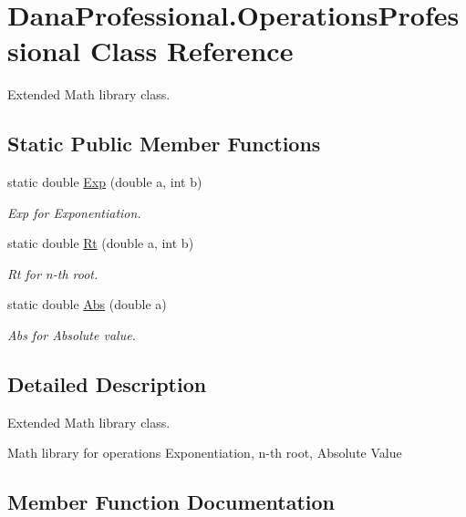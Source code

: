 \hypertarget{classDanaProfessional_1_1OperationsProfessional}{}\section{Dana\+Professional.\+Operations\+Professional Class Reference}
\label{classDanaProfessional_1_1OperationsProfessional}


Extended Math library class.  


\subsection*{Static Public Member Functions}
\begin{DoxyCompactItemize}
\item 
static double \hyperlink{classDanaProfessional_1_1OperationsProfessional_a42a851ecd5d926bbf74edad1f8059866}{Exp} (double a, int b)
\begin{DoxyCompactList}\small\item\em Exp for Exponentiation. \end{DoxyCompactList}\item 
static double \hyperlink{classDanaProfessional_1_1OperationsProfessional_afc68753ca0f20e400155920ab754ea6b}{Rt} (double a, int b)
\begin{DoxyCompactList}\small\item\em Rt for n-\/th root. \end{DoxyCompactList}\item 
static double \hyperlink{classDanaProfessional_1_1OperationsProfessional_a23643e8cfe53efb4944904cacfc03570}{Abs} (double a)
\begin{DoxyCompactList}\small\item\em Abs for Absolute value. \end{DoxyCompactList}\end{DoxyCompactItemize}


\subsection{Detailed Description}
Extended Math library class. 

Math library for operations Exponentiation, n-\/th root, Absolute Value 

\subsection{Member Function Documentation}
\mbox{\label{classDanaProfessional_1_1OperationsProfessional_a23643e8cfe53efb4944904cacfc03570}} 
